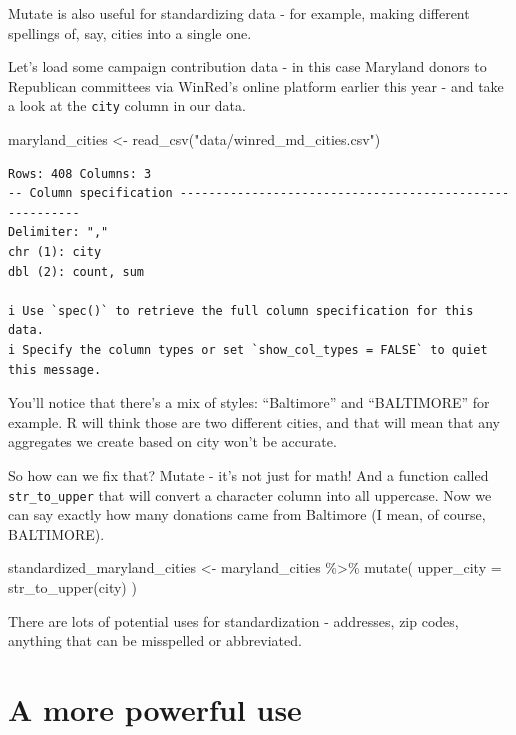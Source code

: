 \documentclass[
  letterpaper,
  DIV=11,
  numbers=noendperiod]{scrreprt}
\newenvironment{Shaded}{\begin{snugshade}}{\end{snugshade}}
\newcommand{\AttributeTok}[1]{\textcolor[rgb]{0.40,0.45,0.13}{#1}}
\newcommand{\FunctionTok}[1]{\textcolor[rgb]{0.28,0.35,0.67}{#1}}
\newcommand{\NormalTok}[1]{\textcolor[rgb]{0.00,0.23,0.31}{#1}}
\newcommand{\OtherTok}[1]{\textcolor[rgb]{0.00,0.23,0.31}{#1}}
\newcommand{\SpecialCharTok}[1]{\textcolor[rgb]{0.37,0.37,0.37}{#1}}
\newcommand{\StringTok}[1]{\textcolor[rgb]{0.13,0.47,0.30}{#1}}
\begin{document}
Mutate is also useful for standardizing data - for example, making
different spellings of, say, cities into a single one.

Let's load some campaign contribution data - in this case Maryland
donors to Republican committees via WinRed's online platform earlier
this year - and take a look at the \texttt{city} column in our data.

\begin{Shaded}
\begin{Highlighting}[]
\NormalTok{maryland\_cities }\OtherTok{\textless{}{-}} \FunctionTok{read\_csv}\NormalTok{(}\StringTok{"data/winred\_md\_cities.csv"}\NormalTok{)}
\end{Highlighting}
\end{Shaded}

\begin{verbatim}
Rows: 408 Columns: 3
-- Column specification --------------------------------------------------------
Delimiter: ","
chr (1): city
dbl (2): count, sum

i Use `spec()` to retrieve the full column specification for this data.
i Specify the column types or set `show_col_types = FALSE` to quiet this message.
\end{verbatim}

You'll notice that there's a mix of styles: ``Baltimore'' and
``BALTIMORE'' for example. R will think those are two different cities,
and that will mean that any aggregates we create based on city won't be
accurate.

So how can we fix that? Mutate - it's not just for math! And a function
called \texttt{str\_to\_upper} that will convert a character column into
all uppercase. Now we can say exactly how many donations came from
Baltimore (I mean, of course, BALTIMORE).

\begin{Shaded}
\begin{Highlighting}[]
\NormalTok{standardized\_maryland\_cities }\OtherTok{\textless{}{-}}\NormalTok{ maryland\_cities }\SpecialCharTok{\%\textgreater{}\%}
  \FunctionTok{mutate}\NormalTok{(}
    \AttributeTok{upper\_city =} \FunctionTok{str\_to\_upper}\NormalTok{(city)}
\NormalTok{  )}
\end{Highlighting}
\end{Shaded}

There are lots of potential uses for standardization - addresses, zip
codes, anything that can be misspelled or abbreviated.

\hypertarget{a-more-powerful-use}{%
\section{A more powerful use}\label{a-more-powerful-use}}
\end{document}
